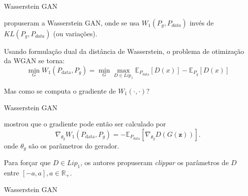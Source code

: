 \documentclass[10pt]{beamer}
\begin{document}
\begin{frame}[fragile]{Wasserstein GAN}

	\citet{arjovsky2017wasserstein} propuseram a Wasserstein GAN,
	onde se usa $W_1(P_g, P_{data})$ invés de $KL(P_g, P_{data})$ (ou variações).

	\vspace{3mm}
	Usando formulação dual da distância de Wasserstein, o problema de otimização
	da WGAN se torna:
	\begin{displaymath}
		\min_{G} W_1(P_{\text{data}},P_g) = \min_{G}
		\max_{D \in Lip_1}\mathbb E_{P_{\text{data}}}[D(x)]
		-\mathbb E_{P_{g}}[D(x)]
		\label{eq:wgan}
	\end{displaymath}

	\vspace{3mm}
	Mas como se computa o gradiente de $W_1(\cdot, \cdot)$?

\end{frame}

\begin{frame}[fragile]{Wasserstein GAN}

	\citet{arjovsky2017wasserstein} mostrou que o gradiente pode então ser calculado
	por
	\begin{displaymath}
		\nabla_{\theta_g} W_1(P_{\text{data}},P_g) = - \mathbb E_{P_{\text{data}}}[\nabla_{\theta_g} D(G(\mathbf z))].
	\end{displaymath}
	onde $\theta_g$ são os parâmetros do gerador.

	Para forçar que $D \in Lip_1$,
	os autores propuseram \textit{clippar} os parâmetros de $D$
	entre $[-a,a], a \in \mathbb R_+$.

\end{frame}

\begin{frame}[fragile]{Wasserstein GAN}






\end{frame}
\end{document}
